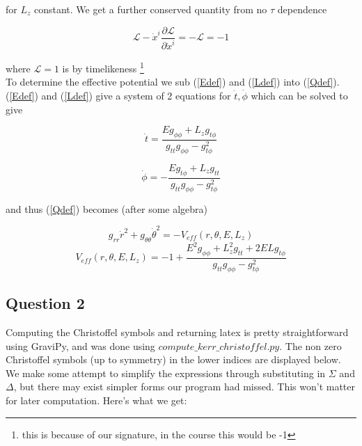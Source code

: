 \documentclass[10pt,a4paper]{report}
\begin{document}
for $L_z$ constant. We get a further conserved quantity from no $\tau$ dependence

\begin{equation}
\mathcal{L} - \dot{x}^i \frac{\partial \mathcal{L}}{\partial \dot{x}^i} = -\mathcal{L} = -1
\label{Qdef}
\end{equation}

where $\mathcal{L} = 1$ is by timelikeness \footnote{this is because of our signature, in the course this would be -1} \\

To determine the effective potential we sub (\ref{Edef}) and (\ref{Ldef}) into (\ref{Qdef}). (\ref{Edef}) and (\ref{Ldef}) give a system of 2 equations for $\dot{t}, \dot{\phi}$ which can be solved to give

\begin{equation}
\dot{t} = \frac{Eg_{\phi\phi}+L_zg_{t\phi}}{g_{tt}g_{\phi\phi}-g_{t\phi}^2}
\end{equation}

\begin{equation}
\dot{\phi} = -\frac{Eg_{t\phi}+L_zg_{tt}}{g_{tt}g_{\phi\phi}-g_{t\phi}^2}
\end{equation}

and thus (\ref{Qdef}) becomes (after some algebra)

\begin{equation}
g_{rr}\dot{r}^2+g_{\theta\theta}\dot{\theta}^2 = -V_{eff}(r, \theta, E, L_z)
\label{effpot}
\end{equation}
\begin{equation*}
V_{eff}(r, \theta, E, L_z) = -1 + \frac{E^2g_{\phi\phi} + L_z^2g_{tt} + 2ELg_{t\phi}}{g_{tt}g_{\phi\phi}-g_{t\phi}^2}
\end{equation*}

\subsection*{Question 2}
Computing the Christoffel symbols and returning latex is pretty straightforward using GraviPy, and was done using $compute\_kerr\_christoffel.py$. The non zero Christoffel symbols (up to symmetry) in the lower indices are displayed below. We make some attempt to simplify the expressions through substituting in $\Sigma$ and $\Delta$, but there may exist simpler forms our program had missed. This won't matter for later computation. Here's what we get:
\end{document}
